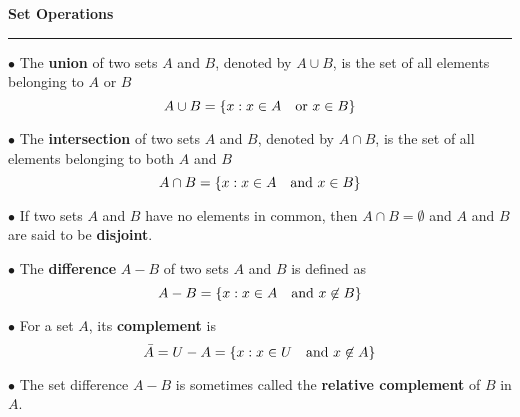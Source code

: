 {\bf Set Operations}
\hrule
\vskip 6pt

$\bullet$ The {\bf union} of two sets $A$ and $B$, denoted by $A\cup B$, is the set of all elements belonging to $A$ or $B$ $$A\cup B=\lbrace x: x\in A \quad\hbox{or } x\in B\rbrace$$

$\bullet$ The {\bf intersection} of two sets $A$ and $B$, denoted by $A\cap B$, is the set of all elements belonging to both $A$ and $B$ $$A\cap B=\lbrace x: x\in A \quad\hbox{and } x\in B\rbrace$$

$\bullet$ If two sets $A$ and $B$ have no elements in common, then $A\cap B=\emptyset$ and $A$ and $B$ are said to be {\bf disjoint}.
\vskip 1pc

$\bullet$ The {\bf difference} $A-B$ of two sets $A$ and $B$ is defined as $$A-B=\lbrace x: x\in A \quad\hbox{and } x\not\in B\rbrace$$

$\bullet$ For a set $A$, its {\bf complement} is $${\bar A}=U-A=\lbrace x:x\in U \quad\hbox{and } x\not\in A \rbrace$$

$\bullet$ The set difference $A-B$ is sometimes called the {\bf relative complement} of $B$ in $A$.

\vfill\eject
